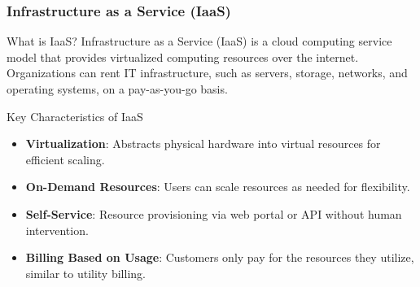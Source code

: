 \documentclass[aspectratio=169]{beamer}
\begin{document}
\begin{frame}[fragile]
    \frametitle{Infrastructure as a Service (IaaS)}
    \begin{block}{What is IaaS?}
        Infrastructure as a Service (IaaS) is a cloud computing service model that provides virtualized computing resources over the internet. Organizations can rent IT infrastructure, such as servers, storage, networks, and operating systems, on a pay-as-you-go basis.
    \end{block}
    
    \begin{block}{Key Characteristics of IaaS}
        \begin{itemize}
            \item \textbf{Virtualization}: Abstracts physical hardware into virtual resources for efficient scaling.
            \item \textbf{On-Demand Resources}: Users can scale resources as needed for flexibility.
            \item \textbf{Self-Service}: Resource provisioning via web portal or API without human intervention.
            \item \textbf{Billing Based on Usage}: Customers only pay for the resources they utilize, similar to utility billing.
        \end{itemize}
    \end{block}
\end{frame}
\end{document}
